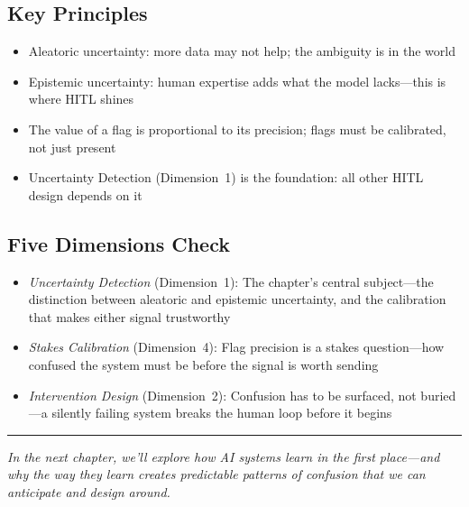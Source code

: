 \subsection*{Key Principles}

\begin{itemize}
    \item Aleatoric uncertainty: more data may not help; the ambiguity is in the world
    \item Epistemic uncertainty: human expertise adds what the model lacks---this is where HITL shines
    \item The value of a flag is proportional to its precision; flags must be calibrated, not just present
    \item Uncertainty Detection (Dimension~1) is the foundation: all other HITL design depends on it
\end{itemize}

\subsection*{Five Dimensions Check}

\begin{itemize}
    \item \textit{Uncertainty Detection} (Dimension~1): The chapter's central subject---the distinction between aleatoric and epistemic uncertainty, and the calibration that makes either signal trustworthy
    \item \textit{Stakes Calibration} (Dimension~4): Flag precision is a stakes question---how confused the system must be before the signal is worth sending
    \item \textit{Intervention Design} (Dimension~2): Confusion has to be surfaced, not buried---a silently failing system breaks the human loop before it begins
\end{itemize}

\bigskip
\begin{center}
\rule{0.5\textwidth}{0.4pt}
\end{center}
\bigskip

\noindent\textit{In the next chapter, we'll explore how AI systems learn in the first place---and why the way they learn creates predictable patterns of confusion that we can anticipate and design around.}

